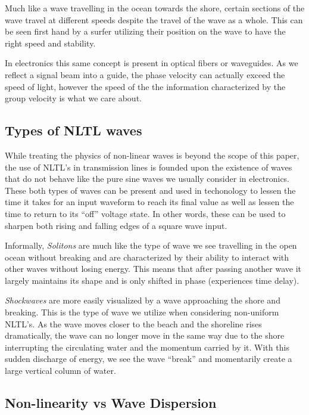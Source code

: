 \documentclass[journal]{IEEEtran} \usepackage[english]{babel}
\begin{document}
Much like a wave travelling in the ocean towards the shore, certain sections of
the wave travel at different speeds despite the travel of the wave as a whole.
This can be seen first hand by a surfer utilizing their position on the wave to
have the right speed and stability. 

In electronics this same concept is present in optical fibers or waveguides. As
we reflect a signal beam into a guide, the phase velocity can actually exceed
the speed of light, however the speed of the the information characterized by
the group velocity is what we care about. 



\subsection{Types of NLTL waves}\label{sub:NLTLTypes}
While treating the physics of non-linear waves is beyond the scope of this
paper, the use of NLTL's in transmission lines is founded upon the existence of
waves that do not behave like the pure sine waves we usually consider in
electronics. These both types of waves can be present and used in techonology to
lessen the time it takes for an input waveform to reach its final value as well
as lessen the time to return to its ``off'' voltage state. In other words, these
can be used to sharpen both rising and falling edges of a square
wave input\cite{afshari2005nonlinear}.

Informally, \emph{Solitons} are much like the type of wave we see
travelling in the open ocean without breaking and are characterized by their
ability to interact with other waves without losing energy. This means that
after passing another wave it largely maintains its shape and is only shifted in
phase (experiences time delay).


\emph{Shockwaves} are more easily visualized by a wave approaching the shore and
breaking. This is the type of wave we utilize when considering non-uniform
NLTL's. As the wave moves closer to the beach and the shoreline rises
dramatically, the wave can no longer move in the same way due to the shore
interrupting the circulating water and the momentum carried by it. With this
sudden discharge of energy, we see the wave ``break'' and momentarily create a
large vertical column of water. 


\subsection{Non-linearity vs Wave Dispersion}\label{NonlinearVsDispersion}
\end{document}
